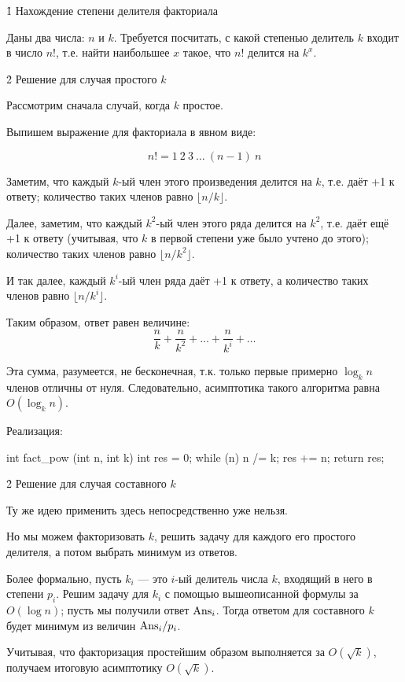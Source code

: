 \h1{ Нахождение степени делителя факториала }

Даны два числа: $n$ и $k$. Требуется посчитать, с какой степенью делитель $k$ входит в число $n!$, т.е. найти наибольшее $x$ такое, что $n!$ делится на $k^x$.


\h2{ Решение для случая простого $k$ }

Рассмотрим сначала случай, когда $k$ простое.

Выпишем выражение для факториала в явном виде:

$$ n! = 1\ 2\ 3\ \ldots\ (n-1)\ n $$

Заметим, что каждый $k$-ый член этого произведения делится на $k$, т.е. даёт +1 к ответу; количество таких членов равно $\lfloor n/k \rfloor$.

Далее, заметим, что каждый $k^2$-ый член этого ряда делится на $k^2$, т.е. даёт ещё +1 к ответу (учитывая, что $k$ в первой степени уже было учтено до этого); количество таких членов равно $\lfloor n/k^2 \rfloor$.

И так далее, каждый $k^i$-ый член ряда даёт +1 к ответу, а количество таких членов равно $\lfloor n/k^i \rfloor$.

Таким образом, ответ равен величине:
$$ \frac{n}{k} + \frac{n}{k^2} + \ldots + \frac{n}{k^i} + \ldots $$

Эта сумма, разумеется, не бесконечная, т.к. только первые примерно $\log_k n$ членов отличны от нуля. Следовательно, асимптотика такого алгоритма равна $O(\log_k n)$.

Реализация:

\code
int fact_pow (int n, int k) {
	int res = 0;
	while (n) {
		n /= k;
		res += n;
	}
	return res;
}
\endcode


\h2{ Решение для случая составного $k$ }

Ту же идею применить здесь непосредственно уже нельзя.

Но мы можем факторизовать $k$, решить задачу для каждого его простого делителя, а потом выбрать минимум из ответов.

Более формально, пусть $k_i$ --- это $i$-ый делитель числа $k$, входящий в него в степени $p_i$. Решим задачу для $k_i$ с помощью вышеописанной формулы за $O (\log n)$; пусть мы получили ответ ${\rm Ans}_i$. Тогда ответом для составного $k$ будет минимум из величин ${\rm Ans}_i / p_i$.

Учитывая, что факторизация простейшим образом выполняется за $O (\sqrt{k})$, получаем итоговую асимптотику $O (\sqrt{k})$.
